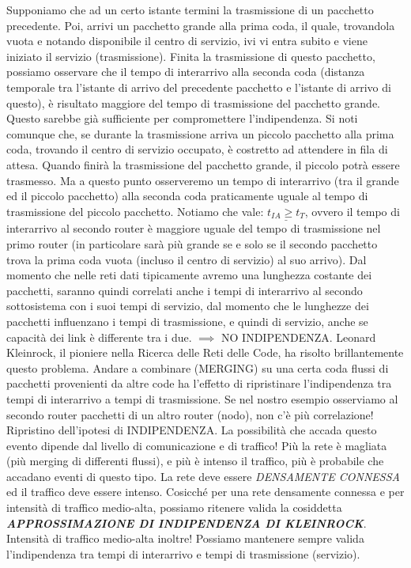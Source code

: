 Supponiamo che ad un certo istante termini la trasmissione di un pacchetto precedente. Poi, arrivi un pacchetto grande alla prima coda, il quale, trovandola vuota e notando disponibile il centro di servizio, ivi vi entra subito e viene iniziato il servizio (trasmissione). Finita la trasmissione di questo pacchetto, possiamo osservare che il tempo di interarrivo alla seconda coda (distanza temporale tra l'istante di arrivo del precedente pacchetto e l'istante di arrivo di questo), è risultato maggiore del tempo di trasmissione del pacchetto grande. Questo sarebbe già sufficiente per compromettere l'indipendenza. Si noti comunque che, se durante la trasmissione arriva un piccolo pacchetto alla prima coda, trovando il centro di servizio occupato, è costretto ad attendere in fila di attesa. Quando finirà la trasmissione del pacchetto grande, il piccolo potrà essere trasmesso. Ma a questo punto osserveremo un tempo di interarrivo (tra il grande ed il piccolo pacchetto) alla seconda coda praticamente uguale al tempo di trasmissione del piccolo pacchetto. Notiamo che vale: $\underline{t_{IA}\geq t_T}$, ovvero il tempo di interarrivo al secondo router è maggiore uguale del tempo di trasmissione nel primo router (in particolare sarà più grande se e solo se il secondo pacchetto trova la prima coda vuota (incluso il centro di servizio) al suo arrivo). Dal momento che nelle reti dati tipicamente avremo una lunghezza costante dei pacchetti, saranno quindi correlati anche i tempi di interarrivo al secondo sottosistema con i suoi tempi di servizio, dal momento che le lunghezze dei pacchetti influenzano i tempi di trasmissione, e quindi di servizio, anche se capacità dei link è differente tra i due. $\implies$ NO INDIPENDENZA. Leonard Kleinrock, il pioniere nella Ricerca delle Reti delle Code, ha risolto brillantemente questo problema. Andare a combinare (MERGING) su una certa coda flussi di pacchetti provenienti da altre code ha l'effetto di ripristinare l'indipendenza tra tempi di interarrivo a tempi di trasmissione. Se nel nostro esempio osserviamo al secondo router pacchetti di un altro router (nodo), non c'è più correlazione! Ripristino dell'ipotesi di INDIPENDENZA. La possibilità che accada questo evento dipende dal livello di comunicazione e di traffico! Più la rete è magliata (più merging di differenti flussi), e più è intenso il traffico, più è probabile che accadano eventi di questo tipo. La rete deve essere \textit{DENSAMENTE CONNESSA} ed il traffico deve essere intenso. Cosicché per una rete densamente connessa e per intensità di traffico medio-alta, possiamo ritenere valida la cosiddetta \textit{\textbf{APPROSSIMAZIONE DI INDIPENDENZA DI KLEINROCK}}. Intensità di traffico medio-alta inoltre! Possiamo mantenere sempre valida l'indipendenza tra tempi di interarrivo e tempi di trasmissione (servizio).

